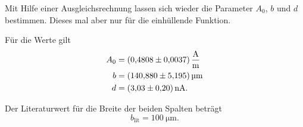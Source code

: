 \noindent Mit Hilfe einer Ausgleichsrechnung lassen sich wieder die Parameter $A_0$, $b$ und $d$ bestimmen. Dieses mal aber nur für die einhüllende Funktion. 

\noindent Für die Werte gilt
\begin{align*}
    A_0 &= \SI{0.4808 (037)}{\ampere\per\meter} \\
    b &= \SI{140.88 \pm 5.195}{\micro\meter} \\
    d &= \SI{3.03(20)}{\nano\ampere}. 
\end{align*}

\noindent Der Literaturwert für die Breite der beiden Spalten beträgt
\begin{equation*}
    b_{\text{lit}} = \SI{100}{\micro\meter}.
\end{equation*}
